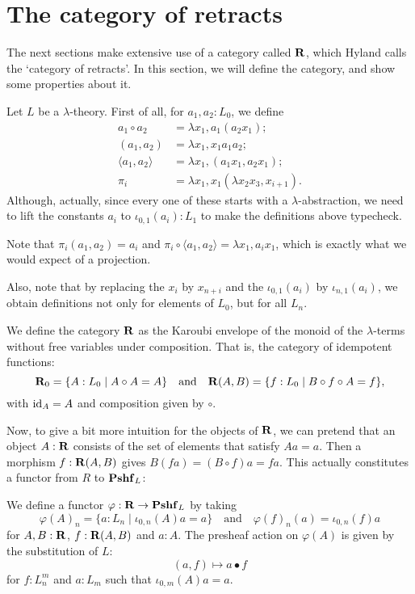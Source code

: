\section{The category of retracts}

The next sections make extensive use of a category called $ \mathbf{R} $, which Hyland calls the `category of retracts'. In this section, we will define the category, and show some properties about it.

Let $ L $ be a $ \lambda $-theory. First of all, for $ a_1, a_2: L_0 $, we define
\begin{align*}
  a_1 \circ a_2 &= \lambda x_1, a_1 (a_2 x_1);\\
  (a_1, a_2) &= \lambda x_1, x_1 a_1 a_2;\\
  \langle a_1, a_2 \rangle &= \lambda x_1, (a_1 x_1, a_2 x_1);\\
  \pi_i &= \lambda x_1, x_1 (\lambda x_2 x_3, x_{i + 1}).
\end{align*}
Although, actually, since every one of these starts with a $ \lambda $-abstraction, we need to lift the constants $ a_i $ to $ \iota_{0, 1}(a_i): L_1 $ to make the definitions above typecheck.

Note that $ \pi_i (a_1, a_2) = a_i $ and $ \pi_i \circ \langle a_1, a_2 \rangle = \lambda x_1, a_i x_1 $, which is exactly what we would expect of a projection.

Also, note that by replacing the $ x_i $ by $ x_{n + i} $ and the $ \iota_{0, 1}(a_i) $ by $ \iota_{n, 1}(a_i) $, we obtain definitions not only for elements of $ L_0 $, but for all $ L_n $.

\begin{definition}
  We define the category $ \mathbf{R} $ as the Karoubi envelope of the monoid of the $ \lambda $-terms without free variables under composition. That is, the category of idempotent functions:
  \[ \mathbf{R}_0 = \{ A : L_0 \mid A \circ A = A \} \quad \text{and} \quad \mathbf{R}(A, B) = \{ f: L_0 \mid B \circ f \circ A = f \}, \]
  with $ \text{id}_{A} = A $ and composition given by $ \circ $.
\end{definition}

Now, to give a bit more intuition for the objects of $ \mathbf{R} $, we can pretend that an object $ A : \mathbf{R} $ consists of the set of elements that satisfy $ A a = a $. Then a morphism $ f : \mathbf{R}(A, B) $ gives $ B (f a) = (B \circ f) a = f a $. This actually constitutes a functor from $ R $ to $ \mathbf{Pshf}_{L} $:

\begin{definition}\label{def:retracts-embedding}
  We define a functor $ \varphi: \mathbf{R} \to \mathbf{Pshf}_{L} $ by taking
  \[ \varphi(A)_n = \{ a : L_n \mid \iota_{0, n}(A) a = a \} \quad \text{and} \quad \varphi(f)_n(a) = \iota_{0, n}(f) a \]
  for $ A, B : \mathbf{R} $, $ f: \mathbf{R}(A, B) $ and $ a : A $. The presheaf action on $ \varphi(A) $ is given by the substitution of $ L $:
  \[ (a, f) \mapsto a \bullet f \]
  for $ f : L_n^m $ and $ a : L_m $ such that $ \iota_{0, m}(A) a = a $.
\end{definition}

